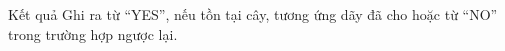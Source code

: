 Kết quả
Ghi ra từ “YES”, nếu tồn tại cây, tương ứng dãy đã cho hoặc từ “NO” trong trường hợp ngược lại.